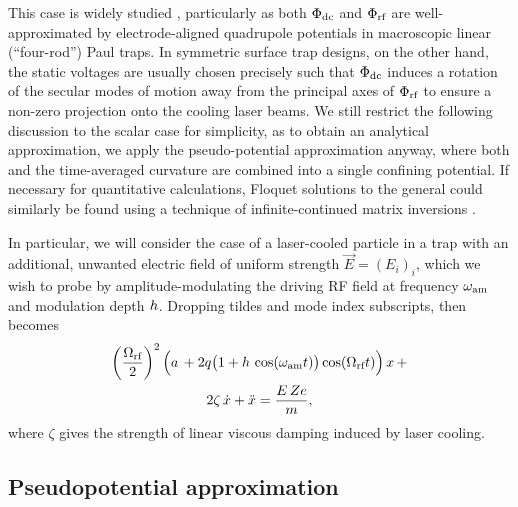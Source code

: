 \documentclass[pra,twocolumn]{revtex4-2}
\begin{document}
This case is widely studied \cite{Leibfried2003}, particularly as both $\Phi_{\textrm{dc}}$ and $\Phi_{\textrm{rf}}$ are well-approximated by electrode-aligned quadrupole potentials in macroscopic linear (\enquote{four-rod}) Paul traps.
In symmetric surface trap designs, on the other hand, the static voltages are usually chosen precisely such that $\Phi_{\textrm{dc}}$ induces a rotation of the secular modes of motion away from the principal axes of $\Phi_{\textrm{rf}}$ to ensure a non-zero projection onto the cooling laser beams.
We still restrict the following discussion to the scalar case for simplicity, as to obtain an analytical approximation, we apply the pseudo-potential approximation anyway, where both \DC{} and the time-averaged \RF{} curvature are combined into a single confining potential.
If necessary for quantitative calculations, Floquet solutions to the general  could similarly be found using a technique of infinite-continued matrix inversions \cite{houseAnalyticModelElectrostatic2008,landaClassicalQuantumModes2012}.

In particular, we will consider the case of a laser-cooled particle in a trap with an additional, unwanted electric field of uniform strength $\vec{E} = (E_i)_i$, which we wish to probe by amplitude-modulating the driving RF field at frequency $\omega_{\textrm{am}}$ and modulation depth $h$.
Dropping tildes and mode index subscripts,  then becomes
\begin{equation}
\begin{gathered}
	\left(\frac{\Omega_{\textrm{rf}}}{2}\right)^2 \Big(a\, + 2 q \big(1 + h \, \cos(\omega_{\textrm{am}} t) \big) \cos(\Omega_{\textrm{rf}} t)\Big) \, x \, +\\
	2 \zeta\,\dot{x} + \ddot{x} = \frac{E\, Z e}{m},
\end{gathered}
\label{eq:decoupled-mathieu-damped}
\end{equation}
where $\zeta$ gives the strength of linear viscous damping induced by laser cooling.


\subsection{Pseudopotential approximation}
\end{document}
